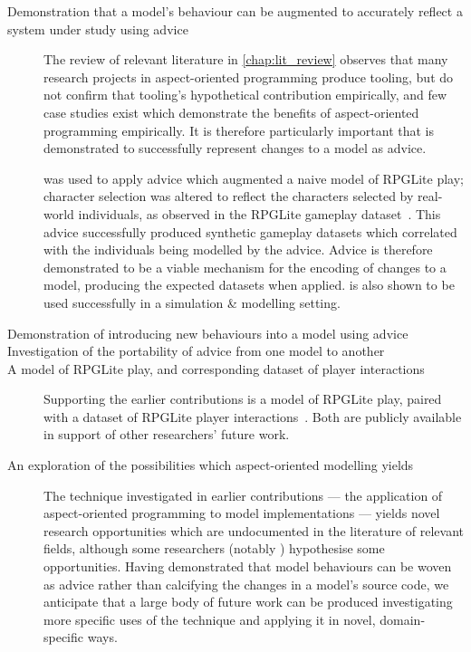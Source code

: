 \begin{description}
  \item[Demonstration that a model's behaviour can be augmented to accurately
    reflect a system under study using advice] The review of relevant literature
    in \cref{chap:lit_review} observes that many research projects in
    aspect-oriented programming produce tooling, but do not confirm that
    tooling's hypothetical contribution empirically, and few case studies exist
    which demonstrate the benefits of aspect-oriented programming empirically.
    It is therefore particularly important that \pdsf{} is demonstrated to
    successfully represent changes to a model as advice.

    \pdsf{} was used to apply advice which augmented a naive model of RPGLite
    play; character selection was altered to reflect the characters selected by
    real-world individuals, as observed in the RPGLite gameplay
    dataset~\cite{rpglite_dataset}. This advice successfully produced synthetic
    gameplay datasets which correlated with the individuals being modelled by
    the advice. Advice is therefore demonstrated to be a viable mechanism for
    the encoding of changes to a model, producing the expected datasets when
    applied. \pdsf{} is also shown to be used successfully in a simulation \&
    modelling setting.

  \item[Demonstration of introducing new behaviours into a model using advice]

  \item[Investigation of the portability of advice from one model to another]

  \item[A model of RPGLite play, and corresponding dataset of player
    interactions] Supporting the earlier contributions is a model of RPGLite
    play, paired with a dataset of RPGLite
    player interactions~\cite{rpglite_dataset}. Both are publicly available in
    support of other researchers' future work.

  \item[An exploration of the possibilities which aspect-oriented modelling
    yields] The technique investigated in earlier contributions --- the
    application of aspect-oriented programming to model implementations ---
    yields novel research opportunities which are undocumented in the literature
    of relevant fields, although some researchers (notably
    \citet{gulyas1999use}) hypothesise some opportunities. Having demonstrated
    that model behaviours can be woven as advice rather than calcifying the
    changes in a model's source code, we anticipate that a large body of future
    work can be produced investigating more specific uses of the technique and
    applying it in novel, domain-specific ways.
    

\end{description}
